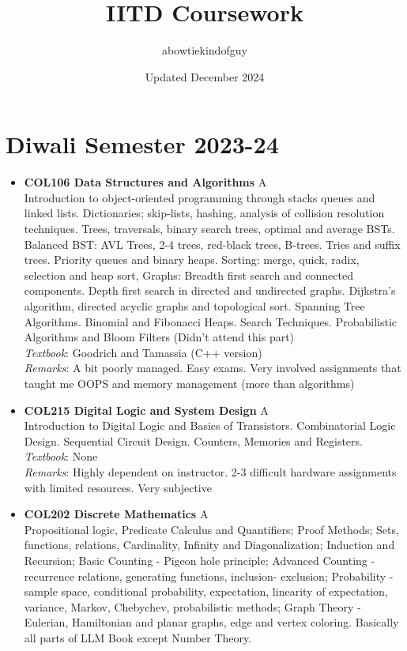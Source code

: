 \documentclass[a4paper]{article}
\title{IITD Coursework}
\author{abowtiekindofguy}
\date{Updated December 2024}
\begin{document}
\maketitle
\section*{Diwali Semester 2023-24}
\begin{itemize}
    \item \textbf{COL106 Data Structures and Algorithms} {\color{red}A}
    \\
    Introduction to object-oriented programming through stacks queues and linked lists. Dictionaries; skip-lists, hashing, analysis of collision resolution techniques. Trees, traversals, binary search trees, optimal and average BSTs. Balanced BST: AVL Trees, 2-4 trees, red-black trees, B-trees. Tries and suffix trees. Priority queues and binary heaps. Sorting: merge, quick, radix, selection and heap sort, Graphs: Breadth first search and connected components. Depth first search in directed and undirected graphs. Dijkstra’s algorithm, directed acyclic graphs and topological sort. Spanning Tree Algorithms. Binomial and Fibonacci Heaps. Search Techniques. Probabilistic Algorithms and Bloom Filters (Didn't attend this part)
    \\
    \textit{Textbook}: Goodrich and Tamassia (C++ version)
    \\
    \textit{Remarks}: A bit poorly managed. Easy exams. Very involved assignments that taught me OOPS and memory management (more than algorithms)
    \item \textbf{COL215 Digital Logic and System Design} {\color{red}A}
    \\
    Introduction to Digital Logic and Basics of Transistors. Combinatorial Logic Design. Sequential Circuit Design. Counters, Memories and Registers. 
    \\
    \textit{Textbook}: None
    \\
    \textit{Remarks}: Highly dependent on instructor. 2-3 difficult hardware assignments with limited resources. Very subjective
    \item \textbf{COL202 Discrete Mathematics} {\color{red}A}
    \\
    Propositional logic, Predicate Calculus and Quantifiers; Proof Methods; Sets, functions, relations, Cardinality, Infinity and Diagonalization; Induction and Recursion; Basic Counting - Pigeon hole principle; Advanced Counting - recurrence relations, generating functions, inclusion- exclusion; Probability - sample space, conditional probability, expectation, linearity of expectation, variance, Markov, Chebychev, probabilistic methods; Graph Theory - Eulerian, Hamiltonian and planar graphs, edge and vertex coloring. Basically all parts of LLM Book except Number Theory.

\end{itemize}
\end{document}
